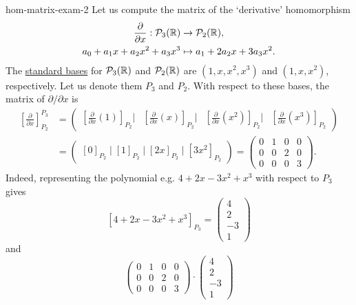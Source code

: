 \begin{example}{}{hom-matrix-exam-2}
 Let us compute the matrix of the `derivative' homomorphism
 \begin{align*}
  \frac{\partial }{\partial x}: \mathcal{P}_3(\mathbb{R}) &\to \mathcal{P}_2(\mathbb{R}),\\
  a_0 + a_1x + a_2x^2 + a_3x^3 & \mapsto a_1 + 2a_2x + 3a_3x^2.
 \end{align*}
 The \hyperref[def:standard-basis]{standard bases} for $\mathcal{P}_3(\mathbb{R})$ and
 $\mathcal{P}_2(\mathbb{R})$ are $(1,x,x^2,x^3)$ and $(1,x,x^2)$, respectively. Let us
 denote them $P_3$ and $P_2$. With respect to these bases, the matrix of
 $\partial / \partial x$ is
 \begin{align*}
  \left[ \frac{\partial }{\partial x} \right]_{P_2}^{P_3}& = 
  \begin{pmatrix}
   \left[ \frac{\partial }{\partial x}(1) \right]_{P_2} \mathrel{\big|} 
   &
   \left[ \frac{\partial }{\partial x}(x) \right]_{P_2} \mathrel{\big|}
   &
   \left[ \frac{\partial }{\partial x}(x^2) \right]_{P_2} \mathrel{\big|} 
   &
   \left[ \frac{\partial }{\partial x}(x^3) \right]_{P_2}
  \end{pmatrix}\\ 
                                                         &= 
  \begin{pmatrix}
   [0]_{P_2} \mid [1]_{P_2} \mid [2x]_{P_2} \mid [3x^2]_{P_2}
  \end{pmatrix} = 
  \begin{pmatrix}
   0 & 1 & 0 & 0\\
   0 & 0 & 2 & 0\\
   0 & 0 & 0 & 3
  \end{pmatrix}.
 \end{align*}
 Indeed, representing the polynomial e.g. $4 + 2x - 3x^2 + x^3$ with respect to
 $P_3$ gives
 \[
  [4 + 2x - 3x^2 + x^3]_{P_3} = 
  \begin{pmatrix}
   4\\
   2\\
   -3\\
   1
  \end{pmatrix}
 \]
 and
 \[
  \begin{pmatrix}
   0 & 1 & 0 & 0\\
   0 & 0 & 2 & 0\\
   0 & 0 & 0 & 3
  \end{pmatrix} \cdot 
  \begin{pmatrix}
   4\\2\\-3\\1

\end{pmatrix}\]
\end{example}
